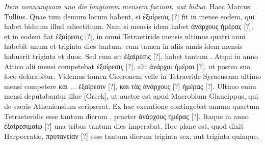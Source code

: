 \emph{Item nonnunquam uno die longiorem
mensem faciunt, aut biduo}.
Haec Marcus Tullius.
Quae tum demum
locum habent, si \textgreek{ὲξαίρεσις [?]} fit in mense eodem,
 qui habet biduum illud
adiectitium.
Nam si mensis idem habet \textgreek{ἀνάρχους ἡμέρας [?]}, et in eodem
fiat \textgreek{ὲξαίρεσις [?]}, in omni Tetraetiride mensis ultimus quatri anni
 habebit
unum et triginta dies tantum: cum tamen in aliis annis idem mensis habuerit
triginta et duos.
Sed cum sit \textgreek{ὲξαίρεσις [?]}, habet tantum .
Atqui
in anno Attico alii mensi competebat \textgreek{ὲξαίρεσις [?]}, alii
 \textgreek{ἀνάρχοι ἡμέραι [?]}, ut postea
suo loco delarabitur.
Videmus tamen Ciceronem velle in Tetraeride
Syracusana ultimo mensi competere \textgreek{και ... ὲξαίρεσιν [?]},
 \textgreek{και τὰς ἀνάρχους [?]}
\textgreek{ἡμέρας [?]}.
Ultimo enim mensi deputabantur illae \textgreek{[Greek]},
ut auctor est apud Macrobium Glaucippus, qui de sacris Atheniensium
scripserat.
Ex hac exemtione contingebat annum quartum Tetraeteridis
esse tantum dierum , praeter \textgreek{ἀνάρχους ἡμέρας [?]}.
Itaque in anno
\textgreek{ὲξαίρεσιμαίῳ [?]} una tribus  tantum dies imperabat.
Hoc plane est,
quod dixit Harpocratio, \textgreek{πρυτανείαν [?]} esse tantum
 dierum triginta sex, aut
triginta quinque.

